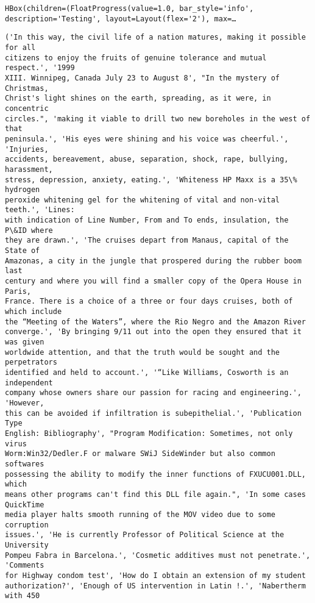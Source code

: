 \documentclass[10pt]{article}
\begin{document}
    
    \begin{verbatim}
HBox(children=(FloatProgress(value=1.0, bar_style='info', description='Testing', layout=Layout(flex='2'), max=…
    \end{verbatim}

    
    \begin{Verbatim}[commandchars=\\\{\}]
('In this way, the civil life of a nation matures, making it possible for all
citizens to enjoy the fruits of genuine tolerance and mutual respect.', '1999
XIII. Winnipeg, Canada July 23 to August 8', "In the mystery of Christmas,
Christ's light shines on the earth, spreading, as it were, in concentric
circles.", 'making it viable to drill two new boreholes in the west of that
peninsula.', 'His eyes were shining and his voice was cheerful.', 'Injuries,
accidents, bereavement, abuse, separation, shock, rape, bullying, harassment,
stress, depression, anxiety, eating.', 'Whiteness HP Maxx is a 35\% hydrogen
peroxide whitening gel for the whitening of vital and non-vital teeth.', 'Lines:
with indication of Line Number, From and To ends, insulation, the P\&ID where
they are drawn.', 'The cruises depart from Manaus, capital of the State of
Amazonas, a city in the jungle that prospered during the rubber boom last
century and where you will find a smaller copy of the Opera House in Paris,
France. There is a choice of a three or four days cruises, both of which include
the “Meeting of the Waters”, where the Rio Negro and the Amazon River
converge.', 'By bringing 9/11 out into the open they ensured that it was given
worldwide attention, and that the truth would be sought and the perpetrators
identified and held to account.', '“Like Williams, Cosworth is an independent
company whose owners share our passion for racing and engineering.', 'However,
this can be avoided if infiltration is subepithelial.', 'Publication Type
English: Bibliography', "Program Modification: Sometimes, not only virus
Worm:Win32/Dedler.F or malware SWiJ SideWinder but also common softwares
possessing the ability to modify the inner functions of FXUCU001.DLL, which
means other programs can't find this DLL file again.", 'In some cases QuickTime
media player halts smooth running of the MOV video due to some corruption
issues.', 'He is currently Professor of Political Science at the University
Pompeu Fabra in Barcelona.', 'Cosmetic additives must not penetrate.', 'Comments
for Highway condom test', 'How do I obtain an extension of my student
authorization?', 'Enough of US intervention in Latin !.', 'Nabertherm with 450

\end{Verbatim}
\end{document}

